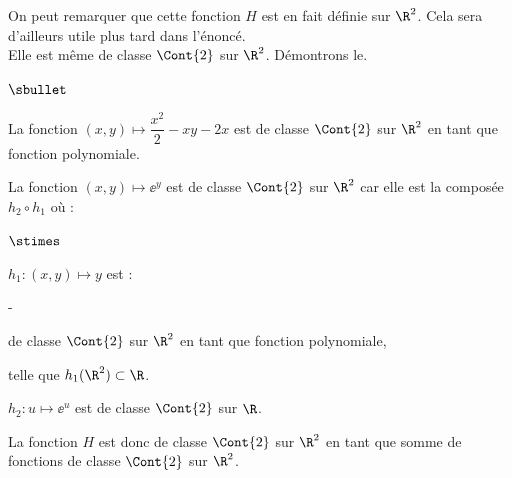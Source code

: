 \begin{remark}
  On peut remarquer que cette fonction $H$ est en fait définie sur 
  $\R^2$. Cela sera d'ailleurs utile plus tard dans l'énoncé. \\
  Elle est même de classe $\Cont{2}$ sur $\R^2$.
  Démontrons le.~\\[-.4cm]
  \begin{noliste}{$\sbullet$}
    \item La fonction $(x,y) \mapsto \dfrac{x^2}{2} -xy -2x$ est de 
    classe $\Cont{2}$ sur $\R^2$ en tant que fonction polynomiale.
    \item La fonction $(x,y) \mapsto \ee^y$ est de classe $\Cont{2}$
    sur $\R^2$ car elle est la composée $h_2 \circ h_1$ où :
    \begin{noliste}{$\stimes$}
      \item $h_1 : (x,y) \mapsto y$ est :
      \begin{noliste}{-}
	\item de classe $\Cont{2}$ sur $\R^2$ en tant que fonction 
	polynomiale,
	\item telle que $h_1(\R^2) \subset \R$.
      \end{noliste}
      \item $h_2: u \mapsto \ee^u$ est de classe $\Cont{2}$ sur $\R$.
    \end{noliste}
    \item La fonction $H$ est donc de classe $\Cont{2}$ sur $\R^2$
    en tant que somme de fonctions de classe $\Cont{2}$ sur $\R^2$.
  \end{noliste}
\end{remark}

